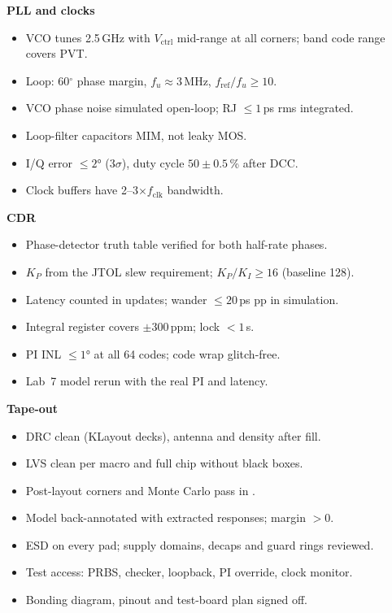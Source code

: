 {\begin{minipage}[t]{0.485\linewidth}
\textbf{\sffamily\color{navy}PLL and clocks}
\begin{itemize}
  \item VCO tunes 2.5\,GHz with $V_\mathrm{ctrl}$ mid-range at all corners; band code range covers PVT.
  \item Loop: 60$^\circ$ phase margin, $f_u\approx3$\,MHz, $f_\mathrm{ref}/f_u\ge10$.
  \item VCO phase noise simulated open-loop; RJ $\le1$\,ps rms integrated.
  \item Loop-filter capacitors MIM, not leaky MOS.
  \item I/Q error $\le\ang{2}$ ($3\sigma$), duty cycle $50\pm0.5$\,\% after DCC.
  \item Clock buffers have 2--3$\times f_\mathrm{clk}$ bandwidth.
\end{itemize}
\textbf{\sffamily\color{navy}CDR}
\begin{itemize}
  \item Phase-detector truth table verified for both half-rate phases.
  \item $K_P$ from the JTOL slew requirement; $K_P/K_I\ge16$ (baseline 128).
  \item Latency counted in updates; wander $\le20$\,ps pp in simulation.
  \item Integral register covers $\pm300$\,ppm; lock $<1$\,\textmu{}s.
  \item PI INL $\le\ang{1}$ at all 64 codes; code wrap glitch-free.
  \item Lab~7 model rerun with the real PI and latency.
\end{itemize}
\textbf{\sffamily\color{navy}Tape-out}
\begin{itemize}
  \item DRC clean (KLayout decks), antenna and density after fill.
  \item LVS clean per macro and full chip without black boxes.
  \item Post-layout corners and Monte Carlo pass in .
  \item Model back-annotated with extracted responses; margin $>0$.
  \item ESD on every pad; supply domains, decaps and guard rings reviewed.
  \item Test access: PRBS, checker, loopback, PI override, clock monitor.
  \item Bonding diagram, pinout and test-board plan signed off.
\end{itemize}
\end{minipage}
}

